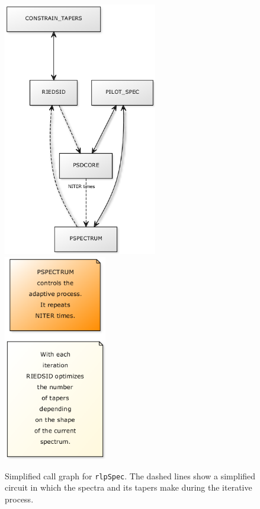 \documentclass{article}\usepackage{graphicx, color}
\newcommand{\Rcmd}[1]{\texttt{#1}}
\newcommand{\rlp}[0]{\Rcmd{rlpSpec}}
\begin{document}
\begin{figure}[htb!]
 \centering
 \includegraphics[width=0.6\textwidth]{yuml_d.png}%
 \includegraphics[width=0.4\textwidth]{yuml_n.png}
 \caption{Simplified call graph for \rlp{}. The dashed lines show a
 simplified circuit
 in which the spectra and its tapers make during the iterative process.}
 \label{fig:calls}
\end{figure}



\end{document}
